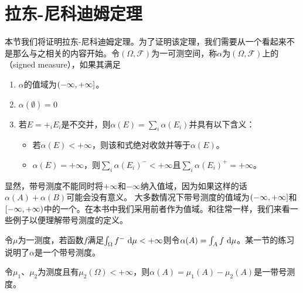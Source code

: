 \documentclass[main.tex]{subfiles}
\begin{document}
\section{拉东-尼科迪姆定理} \label{sec:a.4}
本节我们将证明拉东-尼科迪姆定理。为了证明该定理，我们需要从一个看起来不是那么与之相关的内容开始。令\((\Omega, \mathcal{F})\)为一可测空间，称\(\alpha\)为\((\Omega, \mathcal{F})\)上的（signed measure），如果其满足
\begin{enumerate}
	\item \(\alpha\)的值域为\(\intoc{-\infty, +\infty}\)。
	\item \(\alpha(\emptyset) = 0\)
	\item 若\(E=+_i E_i\)是不交并，则\(\alpha(E) = \sum_i \alpha(E_i)\)并具有以下含义：
	\begin{itemize}
		\item 若\(\alpha(E)<+\infty\)，则该和式绝对收敛并等于\(\alpha(E)\)。
		\item \(\alpha(E)=+\infty\)，则\(\sum_i\alpha(E_i)^-<+\infty\)且\(\sum_i\alpha(E_i)^+=+\infty\)。
	\end{itemize}
\end{enumerate}
显然，带号测度不能同时将\(+\infty\)和\(-\infty\)纳入值域，因为如果这样的话\(\alpha(A)+\alpha(B)\)可能会没有意义。
大多数情况下带号测度的值域为\(\intoc{-\infty, +\infty}\)和\(\intco{-\infty, +\infty}\)中的一个。在本书中我们采用前者作为值域。和往常一样，我们来看一些例子以便理解带号测度的定义。
\begin{example} \label{ex:a.4.1}
	令\(\mu\)为一测度，若函数\(f\)满足\(\int_\Omega f^-\,\dif \mu < +\infty\)则令\(\alpha(A) = \int_A f\,\dif\mu\)。某一节的练习说明了\(\alpha\)是一个带号测度。%
\end{example}
\begin{example} \label{ex:a.4.2}
	令\(\mu_1\)、\(\mu_2\)为测度且有\(\mu_2(\Omega)<+\infty\)，则\(\alpha(A)=\mu_1(A) - \mu_2(A)\)是一带号测度。
\end{example}
\end{document}
